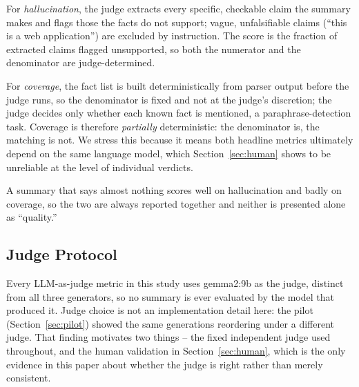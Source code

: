 \documentclass[conference]{IEEEtran}
\newif\ifUNVERIFIED
\begin{document}
For \emph{hallucination}, the judge extracts every specific, checkable claim the summary makes
and flags those the facts do not support; vague, unfalsifiable claims (``this is a web
application'') are excluded by instruction. The score is the fraction of extracted claims
flagged unsupported, so both the numerator and the denominator are judge-determined.

For \emph{coverage}, the fact list is built deterministically from parser output before the
judge runs, so the denominator is fixed and not at the judge's discretion; the judge decides
only whether each known fact is mentioned, a paraphrase-detection task. Coverage is therefore
\emph{partially} deterministic: the denominator is, the matching is not. We stress this because
it means both headline metrics ultimately depend on the same language model, which
Section~\ref{sec:human} shows to be unreliable at the level of individual verdicts.

A summary that says almost nothing scores well on hallucination and badly on coverage, so the
two are always reported together and neither is presented alone as ``quality.''

\subsection{Judge Protocol}
\label{sec:methodology-judges}
Every LLM-as-judge metric in this study uses gemma2:9b as the judge, distinct from all three
generators, so no summary is ever evaluated by the model that produced it. Judge choice is not
an implementation detail here: the pilot (Section~\ref{sec:pilot}) showed the same generations
reordering under a different judge. That finding motivates two things -- the fixed independent
judge used throughout, and the human validation in Section~\ref{sec:human}, which is the only
evidence in this paper about whether the judge is right rather than merely consistent.

\ifUNVERIFIED
We therefore re-scored all 162 stored summaries a second time with gemma2:27b, using the
identical prompt, the identical parser fact list, and no regeneration. That pass supplements
the primary judge and does not replace it; Section~\ref{sec:results-judges} reports where the
two agree.
\fi
\end{document}

